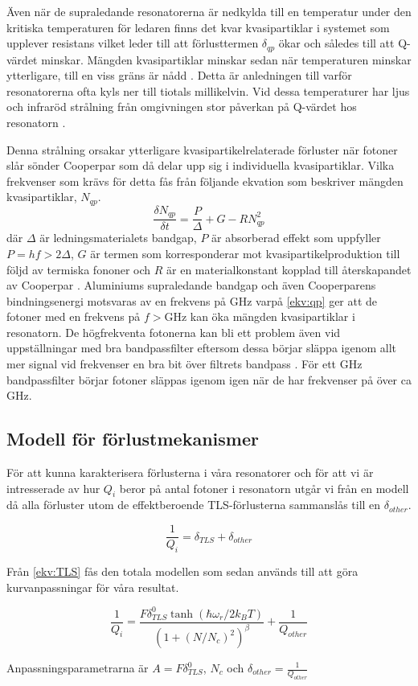 \documentclass[main.tex]{subfiles}
\begin{document}

Även när de supraledande resonatorerna är nedkylda till en temperatur under den kritiska temperaturen för ledaren finns det kvar kvasipartiklar i systemet som upplever resistans vilket leder till att förlusttermen $\delta_{qp}$ ökar och således till att Q-värdet minskar. Mängden kvasipartiklar minskar sedan när temperaturen minskar ytterligare, till en viss gräns är nådd \cite{Barends2011}. Detta är anledningen till varför resonatorerna ofta kyls ner till tiotals millikelvin. Vid dessa temperaturer har ljus och infraröd strålning från omgivningen stor påverkan på Q-värdet hos resonatorn \cite{Barends2011}.

Denna strålning orsakar ytterligare kvasipartikelrelaterade förluster när fotoner slår sönder Cooperpar som då delar upp sig i individuella kvasipartiklar. Vilka frekvenser som krävs för detta fås från följande ekvation som beskriver mängden kvasipartiklar, $N_{qp}$.
\begin{equation}
\label{ekv:qp}
    \frac{\delta N_{qp}}{\delta t}=\frac{P}{\Delta}+G-RN_{qp}^2
\end{equation}
där $\Delta$ är ledningsmaterialets bandgap, $P$ är absorberad effekt som uppfyller $P=hf>2\Delta$, $G$ är termen som korresponderar mot kvasipartikelproduktion till följd av termiska fononer och $R$ är en materialkonstant kopplad till återskapandet av Cooperpar \cite{Barends2011}. Aluminiums supraledande bandgap och även Cooperparens bindningsenergi motsvaras av en frekvens på \unit[88]{GHz} varpå \eqref{ekv:qp} ger att de fotoner med en frekvens på $f>$\unit[88]{GHz} kan öka mängden kvasipartiklar i resonatorn.
De högfrekventa fotonerna kan bli ett problem även vid uppställningar med bra bandpassfilter eftersom dessa börjar släppa igenom allt mer signal vid frekvenser en bra bit över filtrets bandpass \cite{santavicca2008}. För ett \unit[4-8]{GHz} bandpassfilter börjar fotoner släppas igenom igen när de har frekvenser på över ca \unit[20]{GHz}.

\subsection{Modell för förlustmekanismer}
För att kunna karakterisera förlusterna i våra resonatorer och för att vi är intresserade av hur $Q_i$ beror på antal fotoner i resonatorn utgår vi från en modell då alla förluster utom de effektberoende TLS-förlusterna sammanslås till en $\delta_{other}$.

\begin{equation*}
    \frac{1}{Q_i}=\delta_{TLS}+\delta_{other}
\end{equation*}
\noindent

Från \ref{ekv:TLS} fås den totala modellen som sedan används till att göra kurvanpassningar för våra resultat.

\begin{equation}
    \label{ekv:TLSmodel}
    \frac{1}{Q_i}=\frac{F\delta_{TLS}^0\tanh{(\hbar\omega_r/2k_BT)}}{(1+(N/N_c)^2)^\beta}+\frac{1}{Q_{other}}
\end{equation}

Anpassningsparametrarna är $A=F\delta_{TLS}^0$, $N_c$ och $\delta_{other}=\frac{1}{Q_{other}}$
\end{document}
